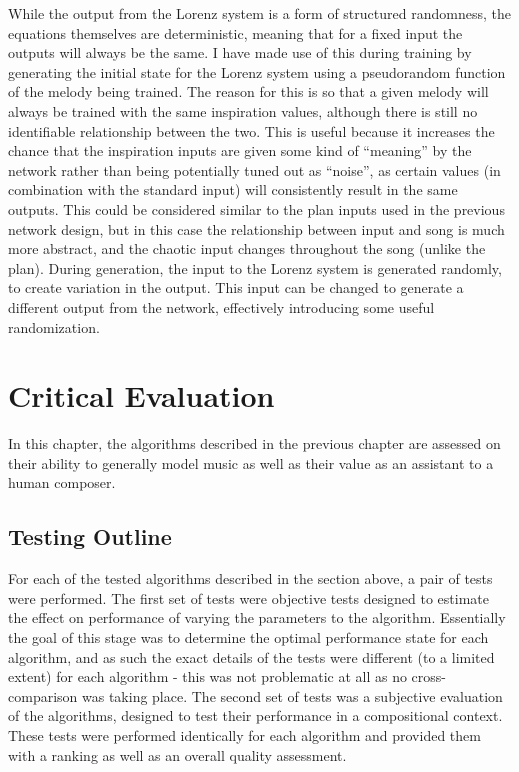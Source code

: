\documentclass[ author={Stephen Livermore-Tozer},
				supervisor={Dr. Peter Flach},
				degree={MEng},
				title={Algorithmic Co-composition Using Machine Learning},
				subtitle={},
				type={research},
				year={2016} ]{dissertation}
\begin{document}
	While the output from the Lorenz system is a form of structured randomness, the equations themselves are deterministic, meaning that for a fixed input the outputs will always be the same. I have made use of this during training by generating the initial state for the Lorenz system using a pseudorandom function of the melody being trained. The reason for this is so that a given melody will always be trained with the same inspiration values, although there is still no identifiable relationship between the two. This is useful because it increases the chance that the inspiration inputs are given some kind of ``meaning'' by the network rather than being potentially tuned out as ``noise'', as certain values (in combination with the standard input) will consistently result in the same outputs. This could be considered similar to the plan inputs used in the previous network design, but in this case the relationship between input and song is much more abstract, and the chaotic input changes throughout the song (unlike the plan). During generation, the input to the Lorenz system is generated randomly, to create variation in the output. This input can be changed to generate a different output from the network, effectively introducing some useful randomization. 
	
	
	
	
	\chapter{Critical Evaluation}
	\label{chap:evaluation}
	
	In this chapter, the algorithms described in the previous chapter are assessed on their ability to generally model music as well as their value as an assistant to a human composer. 
	
	\section{Testing Outline}
	
	For each of the tested algorithms described in the section above, a pair of tests were performed. The first set of tests were objective tests designed to estimate the effect on performance of varying the parameters to the algorithm. Essentially the goal of this stage was to determine the optimal performance state for each algorithm, and as such the exact details of the tests were different (to a limited extent) for each algorithm - this was not problematic at all as no cross-comparison was taking place. The second set of tests was a subjective evaluation of the algorithms, designed to test their performance in a compositional context. These tests were performed identically for each algorithm and provided them with a ranking as well as an overall quality assessment. 
	
\end{document}
